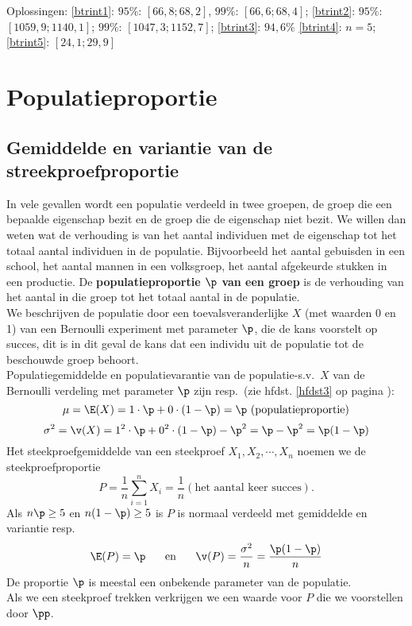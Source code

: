 {{{\sc Oplossingen:}\;
\ref{btrint1}: $95\%$: $[66,8;68,2]$, $99\%$: $[66,6;68,4]$;\;
\ref{btrint2}: $95\%$: $[1059,9;1140,1]$;\; $99\%$: $[1047,3;1152,7]$; \;
\ref{btrint3}: $94,6\%$
\ref{btrint4}: $n=5$;
\ref{btrint5}: $[24,1;29,9]$

}
\section{Populatieproportie}

\subsection{Gemiddelde en variantie van de streekproefproportie}
In vele gevallen wordt een populatie verdeeld in twee groepen, de groep die een bepaalde eigenschap bezit  en de groep die de eigenschap niet bezit. We willen dan weten wat de verhouding is van het aantal individuen met de eigenschap tot het totaal aantal individuen in de populatie. Bijvoorbeeld  het aantal  gebuisden in een school, het aantal mannen in een volksgroep, het aantal afgekeurde stukken in een productie. De {\bf populatieproportie $\p$ van een groep} is de verhouding van het aantal in die groep tot het totaal aantal in de populatie. \\
We beschrijven de populatie door een toevalsveranderlijke $X$ (met waarden 0 en 1) van een Bernoulli experiment met parameter $\p$, die de kans voorstelt op succes, dit is  in dit geval de kans dat een individu uit de populatie tot de beschouwde groep  behoort.\\
Populatiegemiddelde  en populatievarantie van de populatie-s.v.\ $X$ van de Bernoulli verdeling met parameter $\p$ zijn resp.\ (zie hfdst. \ref{hfdst3} op pagina \pageref{kenber}):
$$\mu=\E(X)=1\cdot\p+0\cdot(1-\p)=\p\mbox{ (populatieproportie)}$$
$$\sigma^2=\v(X)=1^2\cdot \p+0^2\cdot (1-\p)-\p^2=\p-\p^2=\p(1-\p)$$
Het steekproefgemiddelde van een steekproef $X_1,X_2,\cdots,X_n$ noemen we de steekproefproportie $$P=\frac{1}{n}\sum_{i=1}^nX_i=\frac{1}{n}(\mbox{het aantal keer succes}).$$ Als $n\p\geq 5$ en $n(1-\p)\geq 5$ is $P$ is normaal verdeeld met gemiddelde en variantie resp.\ 
$$\E(P)=\p\hspace{0,5cm}\mbox{ en }\hspace{0,5cm}\v(P)=\frac{\sigma^2}{n}=\frac{\p(1-\p)}{n}$$
De proportie $\p$ is meestal een onbekende parameter van de populatie. \\Als we een steekproef trekken verkrijgen we een waarde voor $P$ die we voorstellen door $\pp$.



}
